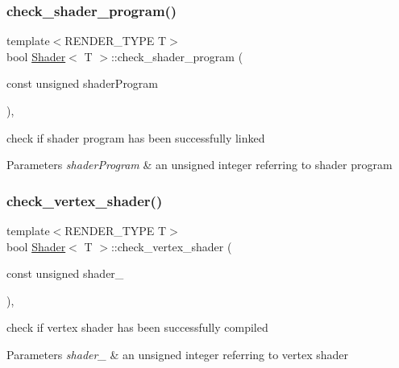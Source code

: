 \subsubsection{\texorpdfstring{check\+\_\+shader\+\_\+program()}{check\_shader\_program()}}
{\footnotesize\ttfamily template$<$R\+E\+N\+D\+E\+R\+\_\+\+T\+Y\+PE T$>$ \\
bool \mbox{\hyperlink{classShader}{Shader}}$<$ T $>$\+::check\+\_\+shader\+\_\+program (\begin{DoxyParamCaption}\item[{const unsigned}]{shader\+Program }\end{DoxyParamCaption})\hspace{0.3cm}{\ttfamily [inline]}, {\ttfamily [protected]}}



check if shader program has been successfully linked 


\begin{DoxyParams}{Parameters}
{\em shader\+Program} & an unsigned integer referring to shader program \\
\hline
\end{DoxyParams}
\mbox{\label{classShader_a6be59304dbddc46ae641e6fe6cd02938}} 
\subsubsection{\texorpdfstring{check\+\_\+vertex\+\_\+shader()}{check\_vertex\_shader()}}
{\footnotesize\ttfamily template$<$R\+E\+N\+D\+E\+R\+\_\+\+T\+Y\+PE T$>$ \\
bool \mbox{\hyperlink{classShader}{Shader}}$<$ T $>$\+::check\+\_\+vertex\+\_\+shader (\begin{DoxyParamCaption}\item[{const unsigned}]{shader\+\_\+ }\end{DoxyParamCaption})\hspace{0.3cm}{\ttfamily [inline]}, {\ttfamily [protected]}}



check if vertex shader has been successfully compiled 


\begin{DoxyParams}{Parameters}
{\em shader\+\_\+} & an unsigned integer referring to vertex shader \\
\hline
\end{DoxyParams}
\mbox{\label{classShader_a1176d69a08aef6df3b7850104871a839}} 
